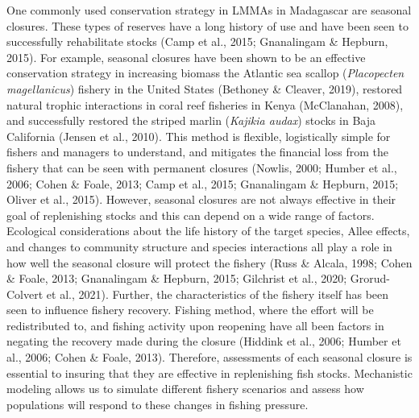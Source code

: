 \documentclass[
]{article}
\begin{document}
One commonly used conservation strategy in LMMAs in Madagascar are seasonal closures. These types of reserves have a long history of use and have been seen to successfully rehabilitate stocks (Camp et al., 2015; Gnanalingam \& Hepburn, 2015). For example, seasonal closures have been shown to be an effective conservation strategy in increasing biomass the Atlantic sea scallop (\emph{Placopecten magellanicus}) fishery in the United States (Bethoney \& Cleaver, 2019), restored natural trophic interactions in coral reef fisheries in Kenya (McClanahan, 2008), and successfully restored the striped marlin (\emph{Kajikia audax}) stocks in Baja California (Jensen et al., 2010). This method is flexible, logistically simple for fishers and managers to understand, and mitigates the financial loss from the fishery that can be seen with permanent closures (Nowlis, 2000; Humber et al., 2006; Cohen \& Foale, 2013; Camp et al., 2015; Gnanalingam \& Hepburn, 2015; Oliver et al., 2015). However, seasonal closures are not always effective in their goal of replenishing stocks and this can depend on a wide range of factors. Ecological considerations about the life history of the target species, Allee effects, and changes to community structure and species interactions all play a role in how well the seasonal closure will protect the fishery (Russ \& Alcala, 1998; Cohen \& Foale, 2013; Gnanalingam \& Hepburn, 2015; Gilchrist et al., 2020; Grorud-Colvert et al., 2021). Further, the characteristics of the fishery itself has been seen to influence fishery recovery. Fishing method, where the effort will be redistributed to, and fishing activity upon reopening have all been factors in negating the recovery made during the closure (Hiddink et al., 2006; Humber et al., 2006; Cohen \& Foale, 2013). Therefore, assessments of each seasonal closure is essential to insuring that they are effective in replenishing fish stocks. Mechanistic modeling allows us to simulate different fishery scenarios and assess how populations will respond to these changes in fishing pressure.
\end{document}
